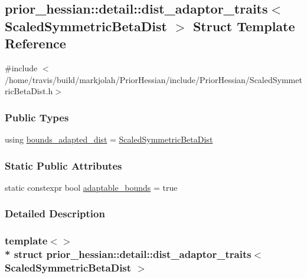 \hypertarget{structprior__hessian_1_1detail_1_1dist__adaptor__traits_3_01ScaledSymmetricBetaDist_01_4}{}\subsection{prior\+\_\+hessian\+:\+:detail\+:\+:dist\+\_\+adaptor\+\_\+traits$<$ Scaled\+Symmetric\+Beta\+Dist $>$ Struct Template Reference}
\label{structprior__hessian_1_1detail_1_1dist__adaptor__traits_3_01ScaledSymmetricBetaDist_01_4}


{\ttfamily \#include $<$/home/travis/build/markjolah/\+Prior\+Hessian/include/\+Prior\+Hessian/\+Scaled\+Symmetric\+Beta\+Dist.\+h$>$}

\subsubsection*{Public Types}
\begin{DoxyCompactItemize}
\item 
using \hyperlink{structprior__hessian_1_1detail_1_1dist__adaptor__traits_3_01ScaledSymmetricBetaDist_01_4_af99b07bac83d88a439a1db6ff22e106a}{bounds\+\_\+adapted\+\_\+dist} = \hyperlink{namespaceprior__hessian_ae84776b8f8ed86c14a5ce47a29b7a1be}{Scaled\+Symmetric\+Beta\+Dist}
\end{DoxyCompactItemize}
\subsubsection*{Static Public Attributes}
\begin{DoxyCompactItemize}
\item 
static constexpr bool \hyperlink{structprior__hessian_1_1detail_1_1dist__adaptor__traits_3_01ScaledSymmetricBetaDist_01_4_a1397bad1101d8766df40fa603d22e4af}{adaptable\+\_\+bounds} = true
\end{DoxyCompactItemize}


\subsubsection{Detailed Description}
\subsubsection*{template$<$$>$\\*
struct prior\+\_\+hessian\+::detail\+::dist\+\_\+adaptor\+\_\+traits$<$ Scaled\+Symmetric\+Beta\+Dist $>$}



